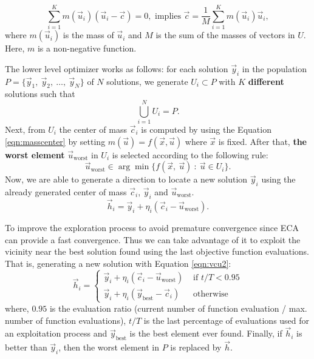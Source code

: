 \documentclass[conference]{IEEEtran}
\begin{document}
\begin{equation}
    \sum_{i = 1}^K m(\vec{u}_i) (\vec{u}_i - \vec{c}) = 0,  \text{ implies } 
    \vec{c} = \dfrac{1}{M} \sum_{i = 1}^K  m(\vec{u}_i)  \vec{u}_i,
    \label{eqn:masscenter}
\end{equation}
%
%
where $m(\vec{u}_i)$ is the mass of $\vec{u}_i$ and  $M$ is the sum of the 
masses of vectors in $U$. Here, $m$ is a non-negative function.
 
The lower level optimizer works as follows: for each solution $\vec{y}_i $ in the population $P = \{ \vec{y}_1,\ \vec{y}_2, \ \ldots, \ \vec{y}_{N} \} $
of $N$  solutions, we generate $U_i \subset P $ with $K$ \textbf{different}
solutions such that
% 
$$
\bigcup_{i=1}^N U_i = P.
$$
%
Next, from $U_i$ the center of mass $\vec{c}_i$ is computed by using the Equation \ref{eqn:masscenter} by setting $m(\vec{u}) = f(\vec{x}, \vec{u})$ where $\vec{x}$ is fixed.
After that, \textbf{the worst element} $\vec{u}_{\text{worst}}$ in $U_i$ is selected
according to the following rule:
% 
$$
    \vec{u}_{\text{worst}} \in \arg \min \{f(\vec{x}, \ \vec{u} ) 
    \ : \
    \vec{u} \in U_i \}.
$$
% 
Now, we are able to generate a direction to locate a new solution $ \vec{y}_i$
using the already generated center of mass $\vec{c}_i$, $\vec{y}_i$ and $\vec{u}_{\text{worst}}$.
% 
$$
    \vec{h}_i = \vec{y}_i + \eta _{i} ( \vec{c}_i - \vec{u}_{ \text{worst} } ).
$$
% 

To improve the exploration process to avoid premature convergence since ECA can provide a fast convergence. Thus we can take advantage of it to exploit the vicinity near the best solution found using the last objective function evaluations. That is, generating a new solution with Equation \ref{eqn:vcu2}:
%
\begin{equation}
    \vec{h}_i = 
    \begin{cases}
        \vec{y}_i + \eta _{i} ( \vec{c}_i - \vec{u}_{ \text{worst} } ) 
               & \text{ if } t/T < 0.95 \\
        \vec{y}_i + \eta _{i} ( \vec{y}_{\text{best}} - \vec{c}_i)
               & \text{ otherwise}
    \end{cases}
    \label{eqn:vcu2}
\end{equation}
%
where, $ 0.95$ is the evaluation ratio (current number of function
evaluation / max. number of function evaluations), $t/T$ is the
last percentage of evaluations used for an exploitation process and $\vec{y}_{\text{best}}$
is the best element ever found. Finally, if $\vec{h}_i$  is better than $\vec{y}_i$,
then the worst element in $P$ is replaced by $\vec{h}$.
% 
\end{document}
